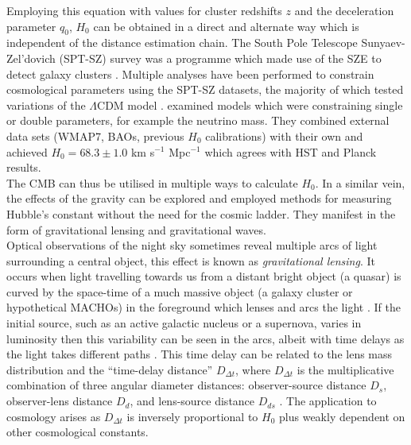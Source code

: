 \documentclass[12pt, onecolumn]{revtex4}    %
\begin{document}
Employing this equation with values for cluster redshifts $z$ and the deceleration parameter $q_0$, $H_0$ can be obtained in a direct and alternate way which is independent of the distance estimation chain. The South Pole Telescope Sunyaev-Zel'dovich (SPT-SZ) survey was a programme which made use of the SZE to detect galaxy clusters \citep{2009AIPC.1185..475C}. Multiple analyses have been performed to constrain cosmological parameters using the SPT-SZ datasets, the majority of which tested variations of the $\Lambda$CDM model \citep{2014ApJ...782...74H, 2016ApJ...832...95D}. \cite{2014ApJ...782...74H} examined models which were constraining single or double parameters, for example the neutrino mass. They combined external data sets (WMAP7, BAOs, previous $H_0$ calibrations) with their own and achieved $H_0=68.3\pm1.0$ km s$^{-1}$ Mpc$^{-1}$ which agrees with HST and Planck results.\\


The CMB can thus be utilised in multiple ways to calculate $H_0$. In a similar vein, the effects of the gravity can be explored and employed methods for measuring Hubble's constant without the need for the cosmic ladder. They manifest in the form of gravitational lensing and gravitational waves. \\

Optical observations of the night sky sometimes reveal multiple arcs of light surrounding a central object, this effect is known as \textit{gravitational lensing}. It occurs when light travelling towards us from a distant bright object (a quasar) is curved by the space-time of a much massive object (a galaxy cluster or hypothetical MACHOs) in the foreground which lenses and arcs the light \citep{carroll_astro}. If the initial source, such as an active galactic nucleus or a supernova, varies in luminosity then this variability can be seen in the arcs, albeit with time delays as the light takes different paths \citep{suyu_2017}. This time delay can be related to the lens mass distribution and the ``time-delay distance'' $D_{\Delta t}$, where $D_{\Delta t}$ is the multiplicative combination of three angular diameter distances: observer-source distance $D_s$, observer-lens distance $D_d$, and lens-source distance $D_{ds}$ \citep{suyu_2017, 2018MNRAS.473..210S}. The application to cosmology arises as $D_{\Delta t}$ is inversely proportional to $H_0$ plus weakly dependent on other cosmological constants. \\
\end{document}

